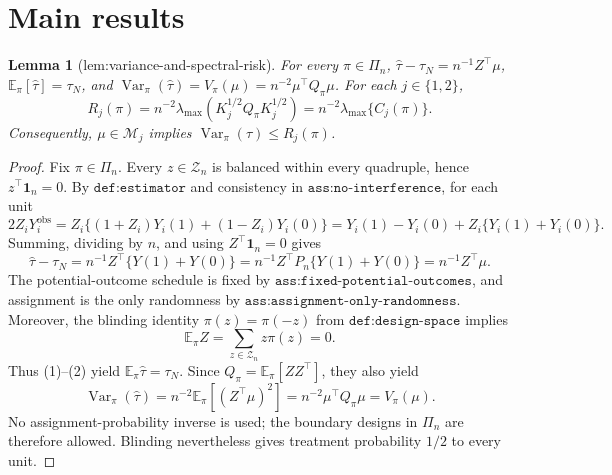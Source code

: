 \documentclass{article}
\newtheorem{lemma}{Lemma}
\begin{document}
\section{Main results}

\begin{lemma}[lem:variance-and-spectral-risk]\label{lem:variance-and-spectral-risk}
For every \(\pi\in\Pi_n\), \(\widehat\tau-\tau_N=n^{-1}Z^\top\mu\), \(\mathbb E_\pi[\widehat\tau]=\tau_N\), and \(\operatorname{Var}_\pi(\widehat\tau)=V_\pi(\mu)=n^{-2}\mu^\top Q_\pi\mu\). For each \(j\in\{1,2\}\), \[R_j(\pi)=n^{-2}\lambda_{\max}(K_j^{1/2}Q_\pi K_j^{1/2})=n^{-2}\lambda_{\max}\{C_j(\pi)\}.\] Consequently, \(\mu\in\mathcal M_j\) implies \(\operatorname{Var}_\pi(\widehat\tau)\le R_j(\pi)\).
\end{lemma}
\begin{proof}
Fix \(\pi\in\Pi_n\).  Every \(z\in\mathcal Z_n\) is balanced within every quadruple, hence \(z^\top\mathbf 1_n=0\).  By \(\texttt{def:estimator}\) and consistency in \(\texttt{ass:no-interference}\), for each unit
\[
2Z_iY_i^{\mathrm{obs}}
=Z_i\{(1+Z_i)Y_i(1)+(1-Z_i)Y_i(0)\}
=Y_i(1)-Y_i(0)+Z_i\{Y_i(1)+Y_i(0)\}.
\]
Summing, dividing by \(n\), and using \(Z^\top\mathbf 1_n=0\) gives
\[
\widehat\tau-\tau_N
=n^{-1}Z^\top\{Y(1)+Y(0)\}
=n^{-1}Z^\top P_n\{Y(1)+Y(0)\}
=n^{-1}Z^\top\mu. \tag{1}
\]
The potential-outcome schedule is fixed by \(\texttt{ass:fixed-potential-outcomes}\), and assignment is the only randomness by \(\texttt{ass:assignment-only-randomness}\).  Moreover, the blinding identity \(\pi(z)=\pi(-z)\) from \(\texttt{def:design-space}\) implies
\[
\mathbb E_\pi Z=\sum_{z\in\mathcal Z_n}z\pi(z)=0. \tag{2}
\]
Thus (1)--(2) yield \(\mathbb E_\pi\widehat\tau=\tau_N\).  Since \(Q_\pi=\mathbb E_\pi[ZZ^\top]\), they also yield
\[
\operatorname{Var}_\pi(\widehat\tau)
=n^{-2}\mathbb E_\pi[(Z^\top\mu)^2]
=n^{-2}\mu^\top Q_\pi\mu
=V_\pi(\mu). \tag{3}
\]
No assignment-probability inverse is used; the boundary designs in \(\Pi_n\) are therefore allowed.  Blinding nevertheless gives treatment probability \(1/2\) to every unit.


\end{proof}
\end{document}
